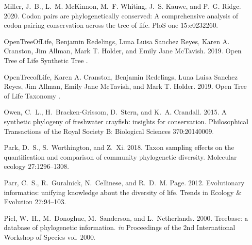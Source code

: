 \documentclass[oupdraft]{sysbio_sse}
\begin{document}
\begin{thebibliography}{49}
Miller, J.~B., L.~M. McKinnon, M.~F. Whiting, J.~S. Kauwe, and P.~G. Ridge.
  2020. Codon pairs are phylogenetically conserved: A comprehensive analysis of
  codon pairing conservation across the tree of life. PloS one 15:e0232260.

{OpenTreeOfLife}, {Benjamin Redelings}, {Luna Luisa Sanchez Reyes}, {Karen A.
  Cranston}, {Jim Allman}, {Mark T. Holder}, and {Emily Jane McTavish}. 2019.
  Open {Tree} of {Life} {Synthetic} {Tree} .

{OpenTreeofLife}, {Karen A. Cranston}, {Benjamin Redelings}, {Luna Luisa
  Sanchez Reyes}, {Jim Allman}, {Emily Jane McTavish}, and {Mark T. Holder}.
  2019. Open {Tree} of {Life} {Taxonomy} .

Owen, C.~L., H.~Bracken-Grissom, D.~Stern, and K.~A. Crandall. 2015. A
  synthetic phylogeny of freshwater crayfish: insights for conservation.
  Philosophical Transactions of the Royal Society B: Biological Sciences
  370:20140009.

Park, D.~S., S.~Worthington, and Z.~Xi. 2018. Taxon sampling effects on the
  quantification and comparison of community phylogenetic diversity. Molecular
  ecology 27:1296--1308.

Parr, C.~S., R.~Guralnick, N.~Cellinese, and R.~D.~M. Page. 2012. Evolutionary
  informatics: unifying knowledge about the diversity of life. Trends in
  Ecology \& Evolution 27:94--103.

Piel, W.~H., M.~Donoghue, M.~Sanderson, and L.~Netherlands. 2000. Treebase: a
  database of phylogenetic information. \emph{in} Proceedings of the 2nd
  International Workshop of Species vol. 2000.


\end{thebibliography}
\end{document}
